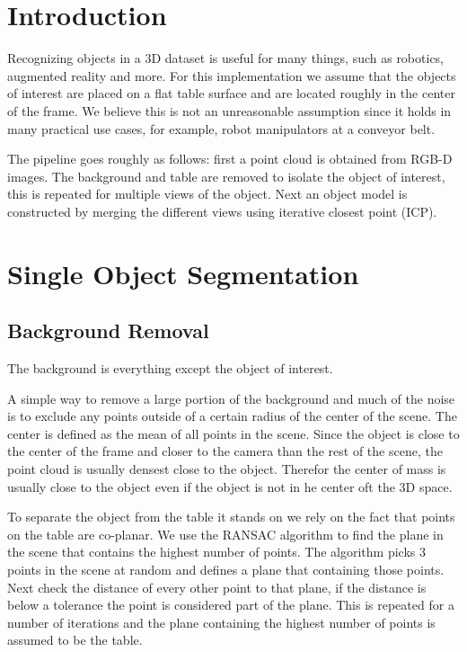 \documentclass[conference]{IEEEtran}
\begin{document}
\section{Introduction}
Recognizing objects in a 3D dataset is useful for many things, such as robotics, augmented reality and more.
For this implementation we assume that the objects of interest are placed on a flat table surface and are located roughly in the center of the frame. We believe this is not an unreasonable assumption since it holds in many practical use cases, for example, robot manipulators at a conveyor belt.

The pipeline goes roughly as follows: first a point cloud is obtained from RGB-D images. The background and table are removed to isolate the object of interest, this is repeated for multiple views of the object. Next an object model is constructed by merging the different views using iterative closest point (ICP). 

\section{Single Object Segmentation}

\subsection{Background Removal}
The background is everything except the object of interest. 

A simple way to remove a large portion of the background and much of the noise is to exclude any points outside of a certain radius of the center of the scene. The center is defined as the mean of all points in the scene. Since the object is close to the center of the frame and closer to the camera than the rest of the scene, the point cloud is usually densest close to the object. Therefor the center of mass is usually close to the object even if the object is not in he center oft the 3D space.

To separate the object from the table it stands on we rely on the fact that points on the table are co-planar. We use the RANSAC algorithm to find the plane in the scene that contains the highest number of points. The algorithm picks 3 points in the scene at random and defines a plane that containing those points. Next check the distance of every other point to that plane, if the distance is below a tolerance the point is considered part of the plane. This is repeated for a number of iterations and the plane containing the highest number of points is assumed to be the table.
\end{document}
